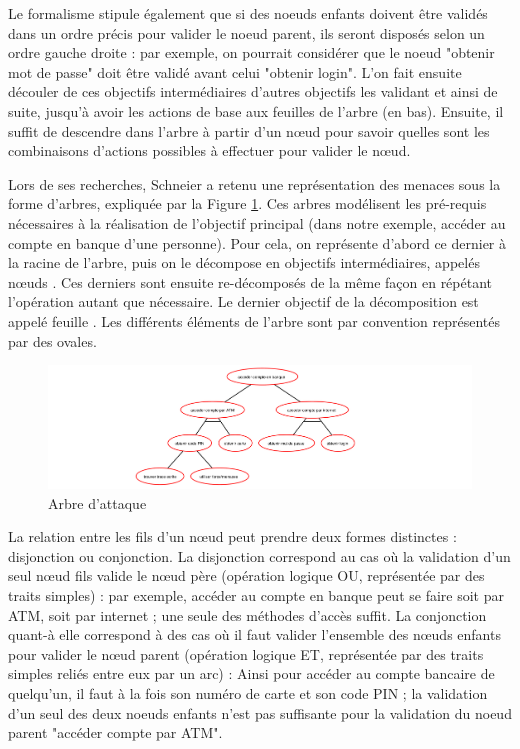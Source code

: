         Le formalisme stipule également que si des noeuds enfants doivent être validés dans un ordre précis pour valider le noeud parent, ils seront disposés selon un ordre gauche droite : par exemple, on pourrait considérer que le noeud "obtenir mot de passe" doit être validé avant celui "obtenir login". L'on fait ensuite découler de ces objectifs intermédiaires d'autres objectifs les validant et ainsi de suite, jusqu'à avoir les actions de base aux feuilles de l'arbre (en bas). Ensuite, il suffit de descendre dans l'arbre à partir d'un nœud pour savoir quelles sont les combinaisons d'actions possibles à effectuer pour valider le nœud.

		Lors de ses recherches, Schneier a retenu une représentation des menaces sous la forme d'arbres, expliquée par la Figure \ref{fig:arbre_exemple_1}. Ces arbres modélisent les pré-requis nécessaires à la réalisation de l'objectif principal (dans notre exemple, accéder au compte en banque d'une personne). Pour cela, on représente d'abord ce dernier à la racine de l'arbre, puis on le décompose en objectifs intermédiaires, appelés \og nœuds \fg. Ces derniers sont ensuite re-décomposés de la même façon en répétant l'opération autant que nécessaire. Le dernier objectif de la décomposition est appelé \og feuille \fg. Les différents éléments de l'arbre sont par convention représentés par des ovales. 
	
		\begin{figure}[htbp]
	        \centering
	        \includegraphics[width=\textwidth]{figure/exemple1_rapport.pdf}%
	        \caption{Arbre d'attaque}
	        \label{fig:arbre_exemple_1}
        \end{figure}

        La relation entre les fils d'un nœud peut prendre deux formes distinctes : disjonction ou conjonction. La disjonction correspond au cas où la validation d'un seul nœud fils valide le nœud père (opération logique OU, représentée par des traits simples) : par exemple, accéder au compte en banque peut se faire soit par ATM, soit par internet ; une seule des méthodes d'accès suffit. La conjonction quant-à elle correspond à des cas où il faut valider l'ensemble des nœuds enfants pour valider le nœud parent (opération logique ET, représentée par des traits simples reliés entre eux par un arc) : Ainsi pour accéder au compte bancaire de quelqu'un, il faut à la fois son numéro de carte et son code PIN ; la validation d'un seul des deux noeuds enfants n'est pas suffisante pour la validation du noeud parent "accéder compte par ATM". 

